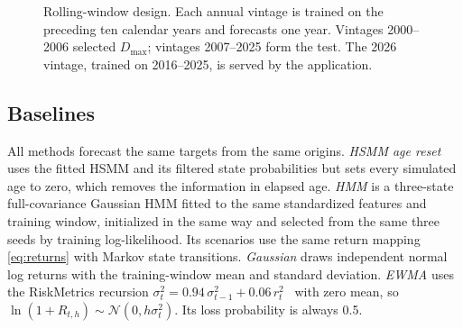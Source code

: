 \documentclass[conference]{IEEEtran}
\newcommand{\Dmax}{D_{\max}}
\newcommand{\Normal}{\mathcal{N}}
\begin{document}
\begin{figure}[t]
\centering
{}
\caption{Rolling-window design. Each annual vintage is trained on the preceding ten calendar years and forecasts one year. Vintages 2000--2006 selected $\Dmax$; vintages 2007--2025 form the test. The 2026 vintage, trained on 2016--2025, is served by the application.}
\label{fig:timeline}
\end{figure}

\subsection{Baselines}
All methods forecast the same targets from the same origins. \emph{HSMM age reset} uses the fitted HSMM and its filtered state probabilities but sets every simulated age to zero, which removes the information in elapsed age. \emph{HMM} is a three-state full-covariance Gaussian HMM fitted to the same standardized features and training window, initialized in the same way and selected from the same three seeds by training log-likelihood. Its scenarios use the same return mapping \eqref{eq:returns} with Markov state transitions. \emph{Gaussian} draws independent normal log returns with the training-window mean and standard deviation. \emph{EWMA} uses the RiskMetrics recursion $\sigma_t^2=0.94\,\sigma_{t-1}^2+0.06\,r_t^2$~\cite{riskmetrics1996} with zero mean, so $\ln(1+R_{t,h})\sim\Normal(0,h\sigma_t^2)$. Its loss probability is always 0.5.
\end{document}
